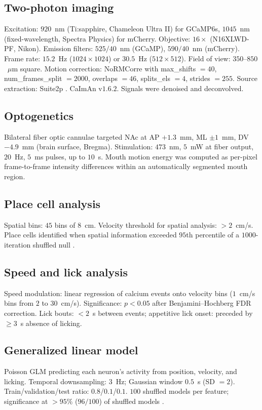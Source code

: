 \documentclass[11pt]{article}
\begin{document}
\subsection{Two-photon imaging}
Excitation: $920$~nm (Ti:sapphire, Chameleon Ultra II) for GCaMP6s, $1045$~nm (fixed-wavelength, Spectra Physics) for mCherry. Objective: $16\times$ (N16XLWD-PF, Nikon). Emission filters: $525/40$~nm (GCaMP), $590/40$~nm (mCherry). Frame rate: $15.2$~Hz ($1024\times 1024$) or $30.5$~Hz ($512\times 512$). Field of view: $350$--$850$~$\mu$m square. Motion correction: NoRMCorre \citep{pnevmatikakis2017normcorre} with max\_shifts $=40$, num\_frames\_split $=2000$, overlaps $=46$, splits\_els $=4$, strides $=255$. Source extraction: Suite2p \citep{pachitariu2017suite2p}. CaImAn v$1.6.2$. Signals were denoised and deconvolved.

\subsection{Optogenetics}
Bilateral fiber optic cannulae targeted NAc at AP $+1.3$~mm, ML $\pm 1$~mm, DV $-4.9$~mm (brain surface, Bregma). Stimulation: $473$~nm, $5$~mW at fiber output, $20$~Hz, $5$~ms pulses, up to $10$~s. Mouth motion energy was computed as per-pixel frame-to-frame intensity differences within an automatically segmented mouth region.

\subsection{Place cell analysis}
Spatial bins: $45$ bins of $8$~cm. Velocity threshold for spatial analysis: $>2$~cm/s. Place cells identified when spatial information exceeded $95$th percentile of a $1000$-iteration shuffled null \citep{skaggs1993information,markus1994spatial}.

\subsection{Speed and lick analysis}
Speed modulation: linear regression of calcium events onto velocity bins ($1$~cm/s bins from $2$ to $30$~cm/s). Significance: $p<0.05$ after Benjamini--Hochberg FDR correction. Lick bouts: $<2$~s between events; appetitive lick onset: preceded by $\geq 3$~s absence of licking.

\subsection{Generalized linear model}
Poisson GLM predicting each neuron's activity from position, velocity, and licking. Temporal downsampling: $3$~Hz; Gaussian window $0.5$~s (SD $= 2$). Train/validation/test ratio: $0.8$/$0.1$/$0.1$. $100$ shuffled models per feature; significance at $>95\%$ ($96/100$) of shuffled models \citep{hardcastle2017multiplexed}.
\end{document}
